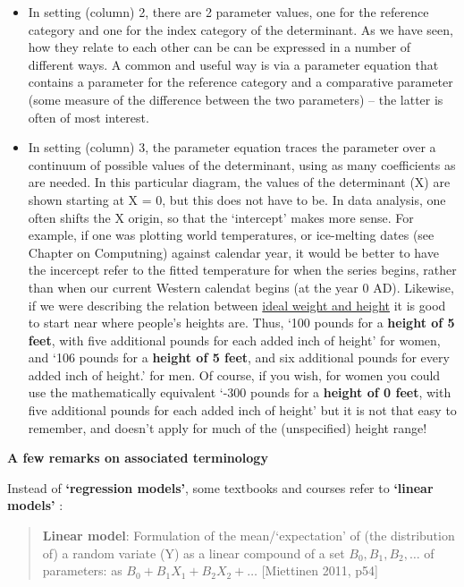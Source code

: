 \documentclass[]{book}
\begin{document}
\begin{itemize}
\item
  In setting (column) 2, there are 2 parameter values, one for the reference category and one for the index category of the determinant. As we have seen, how they relate to each other can be can be expressed in a number of different ways. A common and useful way is via a parameter equation that contains a parameter for the reference category and a comparative parameter (some measure of the difference between the two parameters) -- the latter is often of most interest.
\item
  In setting (column) 3, the parameter equation traces the parameter over a continuum of possible values of the determinant, using as many coefficients as are needed. In this particular diagram, the values of the determinant (X) are shown starting at X = 0, but this does not have to be. In data analysis, one often shifts the X origin, so that the `intercept' makes more sense. For example, if one was plotting world temperatures, or ice-melting dates (see Chapter on Computning) against calendar year, it would be better to have the incercept refer to the fitted temperature for when the series begins, rather than when our current Western calendat begins (at the year 0 AD). Likewise, if we were describing the relation between \href{http://www.biostat.mcgill.ca/hanley/c678/i-weight.pdf}{ideal weight and height} it is good to start near where people's heights are. Thus, `100 pounds for a \textbf{height of 5 feet}, with five additional pounds for each added inch of height' for women, and
  `106 pounds for a \textbf{height of 5 feet}, and six additional pounds for every added inch of height.' for men. Of course, if you wish, for women you could use the mathematically equivalent
  `-300 pounds for a \textbf{height of 0 feet}, with five additional pounds for each added inch of height' but it is not that easy to remember, and doesn't apply for much of the (unspecified) height range!
\end{itemize}

\textbf{A few remarks on associated terminology}

Instead of \textbf{`regression models'}, some textbooks and courses refer to \textbf{`linear models'} :

\begin{quote}
\textbf{Linear model}: Formulation of the mean/`expectation' of (the distribution of) a random variate (Y) as a linear compound of a set \(B_0 , B_1 , B_2 , \dots\) of parameters: as \(B_0 + B_1 X_1 + B_2 X_2 + \dots\) {[}Miettinen 2011, p54{]}
\end{quote}
\end{document}
